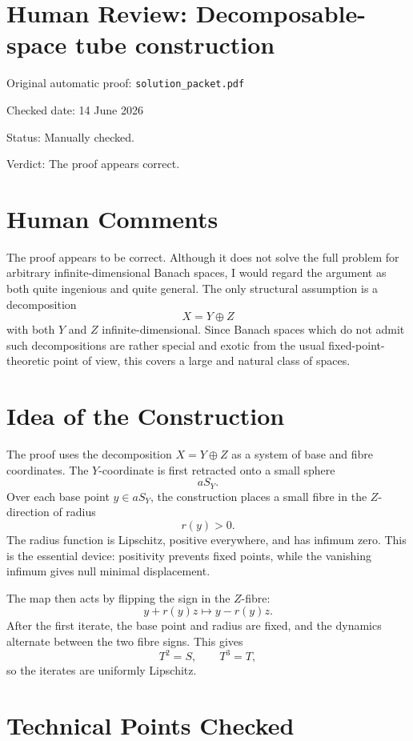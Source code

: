 \documentclass[11pt]{article}
\begin{document}
\section*{Human Review: Decomposable-space tube construction}

\noindent Original automatic proof: \texttt{solution\_packet.pdf}

\noindent Checked date: 14 June 2026

\noindent Status: Manually checked.

\noindent Verdict: The proof appears correct.

\section*{Human Comments}

The proof appears to be correct. Although it does not solve the full problem
for arbitrary infinite-dimensional Banach spaces, I would regard the argument
as both quite ingenious and quite general. The only structural assumption is a
decomposition
\[
  X=Y\oplus Z
\]
with both \(Y\) and \(Z\) infinite-dimensional. Since Banach spaces which do
not admit such decompositions are rather special and exotic from the usual
fixed-point-theoretic point of view, this covers a large and natural class of
spaces.

\section*{Idea of the Construction}

The proof uses the decomposition \(X=Y\oplus Z\) as a system of base and fibre
coordinates. The \(Y\)-coordinate is first retracted onto a small sphere
\[
  aS_Y.
\]
Over each base point \(y\in aS_Y\), the construction places a small fibre in
the \(Z\)-direction of radius
\[
  r(y)>0.
\]
The radius function is Lipschitz, positive everywhere, and has infimum zero.
This is the essential device: positivity prevents fixed points, while the
vanishing infimum gives null minimal displacement.

The map then acts by flipping the sign in the \(Z\)-fibre:
\[
  y+r(y)z \longmapsto y-r(y)z.
\]
After the first iterate, the base point and radius are fixed, and the dynamics
alternate between the two fibre signs. This gives
\[
  T^2=S,\qquad T^3=T,
\]
so the iterates are uniformly Lipschitz.

\section*{Technical Points Checked}
\end{document}
